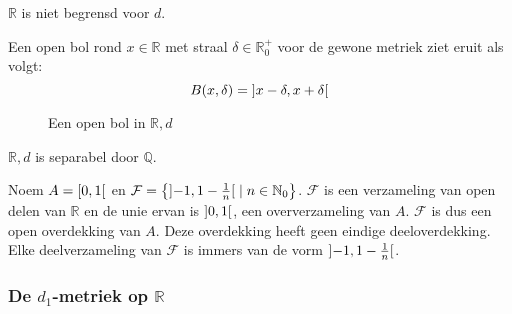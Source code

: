 \documentclass[main.tex]{subfiles}
\begin{document}
\begin{opm}
  $\mathbb{R}$ is niet begrensd voor $d$.
\end{opm}

\begin{vb}
  Een open bol rond $x\in \mathbb{R}$ met straal $\delta\in \mathbb{R}_{0}^{+}$ voor de gewone metriek ziet eruit als volgt:
  \[ B(x,\delta) = \interval[open]{x-\delta}{x+\delta} \]
  \begin{figure}[H]
    \centering
    \caption{Een open bol in $\mathbb{R},d$}
  \end{figure}
\end{vb}

\begin{vb}
  $\mathbb{R},d$ is separabel door $\mathbb{Q}$.
\end{vb}

\begin{vb}
  Noem $A = \interval[open right]{0}{1}$ en $\mathcal{F} = \left\{ \interval[open]{-1}{1-\frac{1}{n}} \mid n \in \mathbb{N}_{0} \right\}$.
  $\mathcal{F}$ is een verzameling van open delen van $\mathbb{R}$ en de unie ervan is $\interval[open]{0}{1}$, een oververzameling van $A$.
  $\mathcal{F}$ is dus een open overdekking van $A$.
  Deze overdekking heeft geen eindige deeloverdekking.
  Elke deelverzameling van $\mathcal{F}$ is immers van de vorm $\interval[open]{-1}{1-\frac{1}{n}}$.
\end{vb}

\subsubsection{De $d_1$-metriek op $\mathbb{R}$}
\label{sec:d_1-metriek-op}
\end{document}
